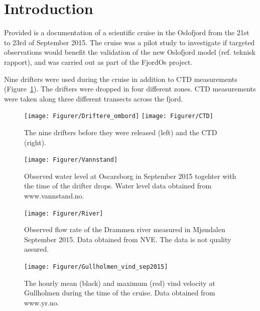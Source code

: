 \documentclass[12pt,a4paper,english]{article}
\begin{document}
\clearpage
\tableofcontents

\clearpage

\section{Introduction}
Provided is a documentation of a scientific cruise in the Oslofjord from the 21st to 23rd of September 2015. The cruise was a pilot study to investigate if targeted observations would benefit the validation of the new Oslofjord model (ref. teknisk rapport), and was carried out as part of the FjordOs project.


Nine drifters were used during the cruise in addition to CTD measurements (Figure~\ref{fig:Utstyr}). The drifters were dropped in four different zones. CTD measurements were taken along three different transects across the fjord. %

\begin{figure}[b]
\centerline{
\texttt{[image: Figurer/Driftere\_ombord]}
\texttt{[image: Figurer/CTD]}
}
\caption{\small
The nine drifters before they were released (left) and the CTD (right).}
\label{fig:Utstyr}
\end{figure}

\begin{figure}[tb]
\centerline{
\texttt{[image: Figurer/Vannstand]}}
\caption{\small
Observed water level at Oscarsborg in September 2015 togehter with the time of the drifter drops. Water level data obtained from www.vannstand.no.}
\label{fig:Waterlevel}
\end{figure}

\begin{figure}[tb]
\centerline{
\texttt{[image: Figurer/River]}}
\caption{\small
Observed flow rate of the Drammen river measured in Mj\o ndalen September 2015. Data obtained from NVE. The data is not quality assured.}
\label{fig:River}
\end{figure}

\begin{figure}[tb]
\centerline{
\texttt{[image: Figurer/Gullholmen\_vind\_sep2015]}}
\caption{\small
The hourly mean (black) and maximum (red) vind velocity at Gullholmen during the time of the cruise. Data obtained from www.yr.no.}
\label{fig:Wind}
\end{figure}
\end{document}
